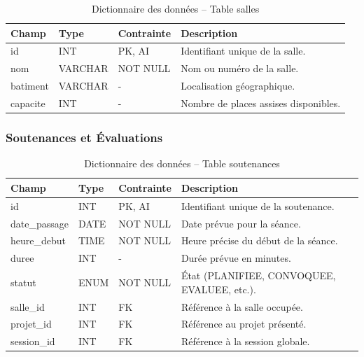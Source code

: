\documentclass[12pt,a4paper]{article}
\begin{document}
\begin{table}[H]
    \centering
    \small
    \begin{tabular}{lp{2cm}lp{6cm}}
        \toprule
        \rowcolor{primary!10}
        \textbf{Champ} & \textbf{Type} & \textbf{Contrainte} & \textbf{Description}                  \\
        \midrule
        id             & INT           & PK, AI              & Identifiant unique de la salle.       \\
        nom            & VARCHAR       & NOT NULL            & Nom ou numéro de la salle.            \\
        batiment       & VARCHAR       & -                   & Localisation géographique.            \\
        capacite       & INT           & -                   & Nombre de places assises disponibles. \\
        \bottomrule
    \end{tabular}
    \caption{Dictionnaire des données -- Table salles}
\end{table}

\subsubsection{Soutenances et Évaluations}

\begin{table}[H]
    \centering
    \small
    \begin{tabular}{lp{2cm}lp{6cm}}
        \toprule
        \rowcolor{primary!10}
        \textbf{Champ} & \textbf{Type} & \textbf{Contrainte} & \textbf{Description}                        \\
        \midrule
        id             & INT           & PK, AI              & Identifiant unique de la soutenance.        \\
        date\_passage  & DATE          & NOT NULL            & Date prévue pour la séance.                 \\
        heure\_debut   & TIME          & NOT NULL            & Heure précise du début de la séance.        \\
        duree          & INT           & -                   & Durée prévue en minutes.                    \\
        statut         & ENUM          & NOT NULL            & État (PLANIFIEE, CONVOQUEE, EVALUEE, etc.). \\
        salle\_id      & INT           & FK                  & Référence à la salle occupée.               \\
        projet\_id     & INT           & FK                  & Référence au projet présenté.               \\
        session\_id    & INT           & FK                  & Référence à la session globale.             \\
        \bottomrule
    \end{tabular}
    \caption{Dictionnaire des données -- Table soutenances}
\end{table}
\end{document}
